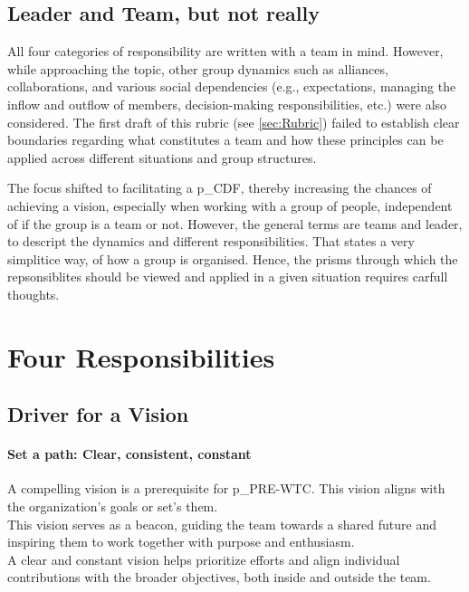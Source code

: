 \subsection{Leader and Team, but not really}

All four categories of responsibility are written with a team in mind. However, while approaching the topic, other group dynamics such as alliances, collaborations, and various social dependencies (e.g., expectations, managing the inflow and outflow of members, decision-making responsibilities, etc.) were also considered. The first draft of this rubric (see \ref{sec:Rubric}) failed to establish clear boundaries regarding what constitutes a team and how these principles can be applied across different situations and group structures.

The focus shifted to facilitating a \gls{p_CDF}, thereby increasing the chances of achieving a vision, especially when working with a group of people, independent of if the group is a team or not. However, the general terms are teams and leader, to descript the dynamics and different responsibilities. That states a very simplitice way, of how a group is organised. Hence, the prisms through which the repsonsiblites should be viewed and applied in a given situation requires carfull thoughts.



\section{Four Responsibilities}

\subsection{Driver for a Vision}\label{responsibility__driver}

\paragraph{Set a path: Clear, consistent, constant}

A compelling vision is a prerequisite for \gls{p_PRE-WTC}. This vision aligns with the organization's goals or set's them.\\

This vision serves as a beacon, guiding the team towards a shared future and inspiring them to work together with purpose and enthusiasm.\\

A clear and constant vision helps prioritize efforts and align individual contributions with the broader objectives, both inside and outside the team.\\

